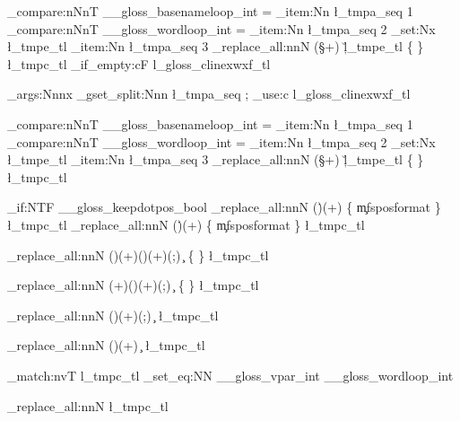 {{		\int_compare:nNnT
								  { \g__gloss_basenameloop_int } = { \seq_item:Nn \l_tmpa_seq { 1 } } %
								  {
		\int_compare:nNnT
								  { \g__gloss_wordloop_int } = { \seq_item:Nn \l_tmpa_seq { 2 } } %
								  {
\tl_set:Nx \l_tmpe_tl { \seq_item:Nn \l_tmpa_seq { 3 } } %
		\regex_replace_all:nnN
				{ (\S+) }
				{ \c{\u{l_tmpe_tl}} \cB\{ \0 \cE\} }
				\l_tmpc_tl
												}}%
			}%
		\tl_if_empty:cF { l_gloss_clinexwxf_tl }
		{  
			\exp_args:Nnnx
	\seq_gset_split:Nnn 
		\l_tmpa_seq
			{ ; } %
			{ \tl_use:c { l_gloss_clinexwxf_tl } }
			
		\int_compare:nNnT
								  { \g__gloss_basenameloop_int } = { \seq_item:Nn \l_tmpa_seq { 1 } } %
								  {
		\int_compare:nNnT
								  { \g__gloss_wordloop_int } = { \seq_item:Nn \l_tmpa_seq { 2 } } %
								  {
\tl_set:Nx \l_tmpe_tl { \seq_item:Nn \l_tmpa_seq { 3 } } %
		\regex_replace_all:nnN
				{ (\S+) }
				{ \c{\u{l_tmpe_tl}} \cB\{ \0 \cE\} }
				\l_tmpc_tl
												}}%
			}%









		\bool_if:NTF
		\g__gloss_keepdotpos_bool
		{
		\regex_replace_all:nnN
				{ (\.)(\w+) }
				{ \1 \cB\{ \c{mfsposformat} \2 \cE\} }
				\l_tmpc_tl
		}
		{
		\regex_replace_all:nnN
				{ (\.)(\w+) }
				{ \cB\{ \c{mfsposformat} \2 \cE\} }
				\l_tmpc_tl
			}
			

		\regex_replace_all:nnN
				{ (\:\:)(\w+)(\!)(\w+)(;) }
				{ \c{\2} \cB\{ \4 \cE\}  }
				\l_tmpc_tl


		\regex_replace_all:nnN
				{ (\w+)(\:\:)(\w+)(;) }
				{ \c{\3} \cB\{ \1 \cE\}  }
				\l_tmpc_tl
			

			
		\regex_replace_all:nnN
				{ (\:)(\w+)(;) }
				{ \c{\2}  }
				\l_tmpc_tl
				
		\regex_replace_all:nnN
				{ (\:)(\w+) }
				{ \c{\2}  }
				\l_tmpc_tl
				

		\regex_match:nvT
				{ \+ }
				{ l_tmpc_tl } 
				{ \int_set_eq:NN 
							\g__gloss_vpar_int 
							\g__gloss_wordloop_int }
				
		\regex_replace_all:nnN
				{ \+ }
				{  }
				\l_tmpc_tl


}




